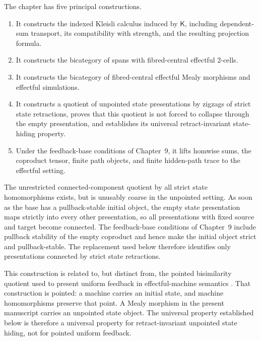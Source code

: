 The chapter has five principal constructions.

\begin{enumerate}
    \item It constructs the indexed Kleisli calculus induced by
    \(\mathsf K\), including dependent-sum transport, its compatibility with
    strength, and the resulting projection formula.

    \item It constructs the bicategory of spans with fibred-central effectful
    2-cells.

    \item It constructs the bicategory of fibred-central effectful Mealy
    morphisms and effectful simulations.

    \item It constructs a quotient of unpointed state presentations by
    zigzags of strict state retractions, proves that this quotient is not
    forced to collapse through the empty presentation, and establishes its
    universal retract-invariant state-hiding property.

    \item Under the feedback-base conditions of Chapter~9, it lifts homwise
    sums, the coproduct tensor, finite path objects, and finite hidden-path
    trace to the effectful setting.
\end{enumerate}

The unrestricted connected-component quotient by all strict state
homomorphisms exists, but is unusably coarse in the unpointed setting.  As
soon as the base has a pullback-stable initial object, the empty state
presentation maps strictly into every other presentation, so all
presentations with fixed source and target become connected.  The
feedback-base conditions of Chapter~9 include pullback stability of the
empty coproduct and hence make the initial object strict and pullback-stable.
The replacement used below therefore identifies only presentations connected
by strict state retractions.

This construction is related to, but distinct from, the pointed
bisimilarity quotient used to present uniform feedback in effectful-machine
semantics
\cite{BonchiDiLavoreRomanEffectfulMealyMachines}.  That construction is
pointed: a machine carries an initial state, and machine homomorphisms
preserve that point.  A Mealy morphism in the present manuscript carries an
unpointed state object.  The universal property established below is
therefore a universal property for retract-invariant unpointed state hiding,
not for pointed uniform feedback.

